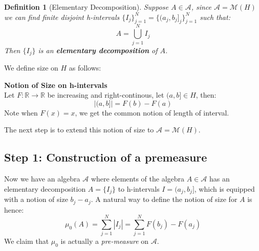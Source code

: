 \documentclass[a4paper,11pt,oneside]{book}
\newtheorem{definition}{Definition}[section]
\begin{document}
\begin{definition}[Elementary Decomposition]Suppose $A\in \mathcal A$, since $\mathcal A=\mathcal M(H)$ we can find finite disjoint h-intervals $\{I_j\}_{j=1}^N=\{(a_j,b_j]_j\}_{j=1}^N$ such that:
\begin{equation}
A=\bigcup_{j=1}^N I_j
\end{equation}
Then $\{I_j\}$ is an \textbf{elementary decomposition} of $A$.

\end{definition}We define size on $H$ as follows:

\begin{framed}
\textbf{Notion of Size on h-intervals}\\
Let $F:\mathbb{R}\to\mathbb{R}$ be increasing and right-continous, let $(a,b]\in H$, then:
\begin{equation}
|(a,b]|=F(b)-F(a)
\end{equation}
Note when $F(x)=x$, we get the common notion of length of interval.
\end{framed}

The next step is to extend this notion of size to $\mathcal A=\mathcal M(H)$.

\subsection{Step 1: Construction of a premeasure}

Now we have an algebra $\mathcal A$ where elements of the algebra $A\in \mathcal A$ has an elementary decomposition $A=\{I_j\}$ to h-intervals $I=(a_j,b_j]$, which is equipped with a notion of size $b_j -a_j$. A natural way to define the notion of size for $A$ is hence:
\begin{equation}
\mu_0(A) = \sum_{j=1}^N |I_j| =\sum_{j=1}^N F(b_j)-F(a_j)
\end{equation}
We claim that $\mu_0$ is actually a \textit{pre-measure} on $\mathcal A$.
\end{document}
